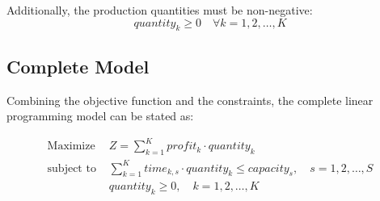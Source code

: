 \documentclass{article}
\begin{document}
Additionally, the production quantities must be non-negative:
\[
quantity_k \geq 0 \quad \forall k = 1, 2, \ldots, K
\]

\subsection*{Complete Model}
Combining the objective function and the constraints, the complete linear programming model can be stated as:

\begin{align*}
\text{Maximize } & Z = \sum_{k=1}^{K} profit_k \cdot quantity_k \\
\text{subject to } & \sum_{k=1}^{K} time_{k,s} \cdot quantity_k \leq capacity_s, \quad s = 1, 2, \ldots, S \\
& quantity_k \geq 0, \quad k = 1, 2, \ldots, K
\end{align*}
\end{document}
